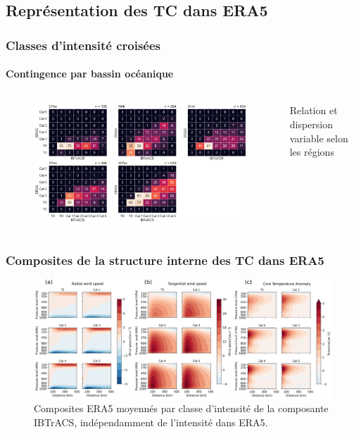 \documentclass[aspectratio=169, usepdftitle=false, xcolor={dvipsnames}, 9pt,table]{beamer}
\begin{document}
\subsection*{Représentation des TC dans ERA5}
\begin{frame}[t]
    \frametitle{Classes d'intensité croisées}
    \framesubtitle{Contingence par bassin océanique}
    \begin{columns}
        \begin{column}{0.85\textwidth}
            \begin{figure}
                \centering
                \includegraphics[width=\textwidth]{Figures/Annexes/crosstable_region.png}
            \end{figure}
        \end{column}
        \begin{column}{0.15\textwidth}
            \scriptsize
            \begin{block}
               Relation et dispersion variable selon les régions 
            \end{block}
        \end{column}
    \end{columns}
\end{frame}

\begin{frame}[t]
    \frametitle{Composites de la structure interne des TC dans ERA5}
    \begin{figure}
        \centering
        \includegraphics[width=\textwidth]{Figures/Annexes/all_composites.png}
        \caption{\small Composites ERA5 moyennés par classe d'intensité de la composante IBTrACS, indépendamment de l'intensité dans ERA5.}
    \end{figure}
\end{frame}
\end{document}
